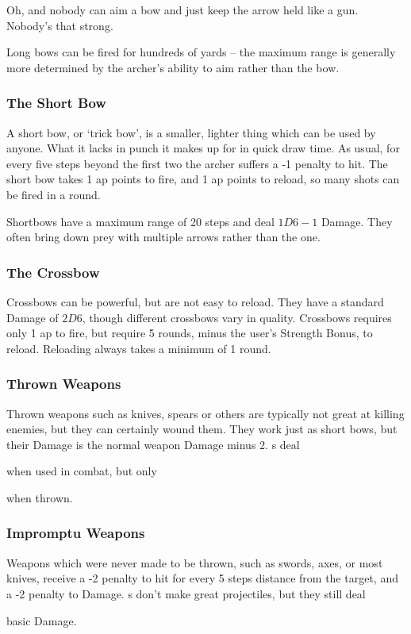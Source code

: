 \begin{multicols}{2}
{  Oh, and nobody can aim a bow and just keep the arrow held like a gun.
  Nobody's that strong.
}

Long bows can be fired for hundreds of yards -- the maximum range is generally more determined by the archer's ability to aim rather than the bow.

\subsubsection{The Short Bow}

A short bow, or `trick bow', is a smaller, lighter thing which can be used by anyone.
What it lacks in punch it makes up for in quick draw time.
As usual, for every five steps beyond the first two the archer suffers a -1 penalty to hit.
The short bow takes 1 \gls{ap} points to fire, and 1 \gls{ap} points to reload, so many shots can be fired in a \gls{round}.

Shortbows have a maximum range of 20 steps and deal $1D6-1$ Damage.
They often bring down prey with multiple arrows rather than the one.

\subsubsection{The Crossbow}
\label{crossbow}
Crossbows can be powerful, but are not easy to reload.
They have a standard Damage of $2D6$, though different crossbows vary in quality.
Crossbows requires only 1 \gls{ap} to fire, but require 5 rounds, minus the user's Strength Bonus, to reload.
Reloading always takes a minimum of 1 round.

\subsubsection{Thrown Weapons}

Thrown weapons such as knives, spears or others are typically not great at killing enemies, but they can certainly wound them.
They work just as short bows, but their Damage is the normal weapon Damage minus 2.
\javelin s deal
\addtocounter{damage}{4}
when used in combat, but only
\addtocounter{damage}{-2}%
 when thrown.

\subsubsection{Impromptu Weapons}

Weapons which were never made to be thrown, such as swords, axes, or most knives, receive a -2 penalty to hit for every 5 steps distance from the target, and a -2 penalty to Damage.
\longsword s don't make great projectiles, but they still deal
\addtocounter{damage}{2} 
basic Damage.

\end{multicols}

